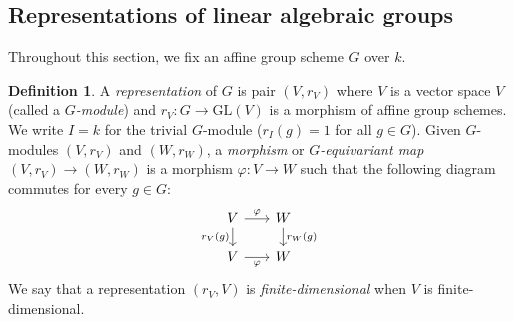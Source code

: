 \documentclass[10pt]{amsart}
\numberwithin{equation}{section}
\newcommand{\vp}{\varphi}
\newcommand{\GL}{\mathrm{GL}}
\theoremstyle{plain}
\theoremstyle{definition}
\newtheorem{defn}[thm]{Definition}
\theoremstyle{remark}
\begin{document}
\subsection{Representations of linear algebraic groups}

Throughout this section, we fix an affine group scheme $G$ over $k$.
\begin{defn}
A \emph{representation} of $G$ is pair $(V, r_V)$ where $V$ is a vector space $V$ (called a \emph{$G$-module}) and $r_V: G \to \GL(V)$ is a morphism of affine group schemes. We write $I = k$ for the trivial $G$-module ($r_I(g) = 1$ for all $g \in G$).    Given $G$-modules $(V, r_V)$ and $(W, r_W)$, a \emph{morphism} or \emph{$G$-equivariant map} $(V, r_V) \to (W, r_W)$ is a morphism $\vp: V \to W$ such that the following diagram commutes for every $g \in G$:
    \begin{equation}\label{eq:1.3}
    \begin{tikzcd}[sep=scriptsize]
    V & W \\
    V & W
    \arrow["\vp", from=1-1, to=1-2]
    \arrow["{r_V(g)}"', from=1-1, to=2-1]
    \arrow["{r_W(g)}", from=1-2, to=2-2]
    \arrow["\vp"', from=2-1, to=2-2]
\end{tikzcd}\end{equation}
We say that a representation $(r_V, V)$ is \emph{finite-dimensional} when $V$ is finite-dimensional.

\end{defn}
\end{document}
